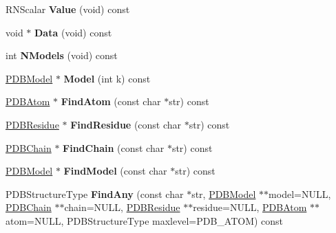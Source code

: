 \begin{DoxyCompactItemize}
\item 
R\+N\+Scalar {\bfseries Value} (void) const \hypertarget{class_p_d_b_file_a57cb538cbf1f41e1d846e68283f09864}{}\label{class_p_d_b_file_a57cb538cbf1f41e1d846e68283f09864}

\item 
void $\ast$ {\bfseries Data} (void) const \hypertarget{class_p_d_b_file_ab2df84fcadbe95b51040f1a1f5f1294a}{}\label{class_p_d_b_file_ab2df84fcadbe95b51040f1a1f5f1294a}

\item 
int {\bfseries N\+Models} (void) const \hypertarget{class_p_d_b_file_ab2170f6dce210b79ea39e3bf61773fd0}{}\label{class_p_d_b_file_ab2170f6dce210b79ea39e3bf61773fd0}

\item 
\hyperlink{class_p_d_b_model}{P\+D\+B\+Model} $\ast$ {\bfseries Model} (int k) const \hypertarget{class_p_d_b_file_ab1c96cdde29ccd513eb9c5b23a47f331}{}\label{class_p_d_b_file_ab1c96cdde29ccd513eb9c5b23a47f331}

\item 
\hyperlink{class_p_d_b_atom}{P\+D\+B\+Atom} $\ast$ {\bfseries Find\+Atom} (const char $\ast$str) const \hypertarget{class_p_d_b_file_a1963e12f06f73dd150a6a96802b9af53}{}\label{class_p_d_b_file_a1963e12f06f73dd150a6a96802b9af53}

\item 
\hyperlink{class_p_d_b_residue}{P\+D\+B\+Residue} $\ast$ {\bfseries Find\+Residue} (const char $\ast$str) const \hypertarget{class_p_d_b_file_a701874b97192b6ed01585d2d9cc90024}{}\label{class_p_d_b_file_a701874b97192b6ed01585d2d9cc90024}

\item 
\hyperlink{class_p_d_b_chain}{P\+D\+B\+Chain} $\ast$ {\bfseries Find\+Chain} (const char $\ast$str) const \hypertarget{class_p_d_b_file_a1e1779d521ab605af53ee9313889c35f}{}\label{class_p_d_b_file_a1e1779d521ab605af53ee9313889c35f}

\item 
\hyperlink{class_p_d_b_model}{P\+D\+B\+Model} $\ast$ {\bfseries Find\+Model} (const char $\ast$str) const \hypertarget{class_p_d_b_file_acf90ab39c605a333a355961c5cd3ee51}{}\label{class_p_d_b_file_acf90ab39c605a333a355961c5cd3ee51}

\item 
P\+D\+B\+Structure\+Type {\bfseries Find\+Any} (const char $\ast$str, \hyperlink{class_p_d_b_model}{P\+D\+B\+Model} $\ast$$\ast$model=N\+U\+LL, \hyperlink{class_p_d_b_chain}{P\+D\+B\+Chain} $\ast$$\ast$chain=N\+U\+LL, \hyperlink{class_p_d_b_residue}{P\+D\+B\+Residue} $\ast$$\ast$residue=N\+U\+LL, \hyperlink{class_p_d_b_atom}{P\+D\+B\+Atom} $\ast$$\ast$atom=N\+U\+LL, P\+D\+B\+Structure\+Type maxlevel=P\+D\+B\+\_\+\+A\+T\+OM) const \hypertarget{class_p_d_b_file_a70529217febf3f0f67b0e4ef3caf7dd8}{}\label{class_p_d_b_file_a70529217febf3f0f67b0e4ef3caf7dd8}


\end{DoxyCompactItemize}
